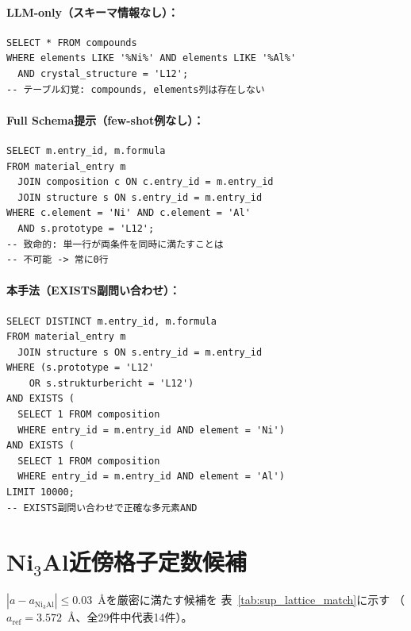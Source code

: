 \documentclass[5p,twocolumn]{elsarticle}
\begin{document}
\paragraph{LLM-only（スキーマ情報なし）：}
\begin{lstlisting}[basicstyle=\ttfamily\scriptsize,breaklines=true]
SELECT * FROM compounds
WHERE elements LIKE '%Ni%' AND elements LIKE '%Al%'
  AND crystal_structure = 'L12';
-- テーブル幻覚: compounds, elements列は存在しない
\end{lstlisting}

\paragraph{Full Schema提示（few-shot例なし）：}
\begin{lstlisting}[basicstyle=\ttfamily\scriptsize,breaklines=true]
SELECT m.entry_id, m.formula
FROM material_entry m
  JOIN composition c ON c.entry_id = m.entry_id
  JOIN structure s ON s.entry_id = m.entry_id
WHERE c.element = 'Ni' AND c.element = 'Al'
  AND s.prototype = 'L12';
-- 致命的: 単一行が両条件を同時に満たすことは
-- 不可能 -> 常に0行
\end{lstlisting}

\paragraph{本手法（EXISTS副問い合わせ）：}
\begin{lstlisting}[basicstyle=\ttfamily\scriptsize,breaklines=true]
SELECT DISTINCT m.entry_id, m.formula
FROM material_entry m
  JOIN structure s ON s.entry_id = m.entry_id
WHERE (s.prototype = 'L12'
    OR s.strukturbericht = 'L12')
AND EXISTS (
  SELECT 1 FROM composition
  WHERE entry_id = m.entry_id AND element = 'Ni')
AND EXISTS (
  SELECT 1 FROM composition
  WHERE entry_id = m.entry_id AND element = 'Al')
LIMIT 10000;
-- EXISTS副問い合わせで正確な多元素AND
\end{lstlisting}

\section{Ni$_3$Al近傍格子定数候補}
\label{sec:sup_lattice_match}

$|a - a_{\text{Ni}_3\text{Al}}| \leq 0.03$~\AA を厳密に満たす候補を
表~\ref{tab:sup_lattice_match}に示す
（$a_{\text{ref}} = 3.572$~\AA、全29件中代表14件）。
\end{document}
